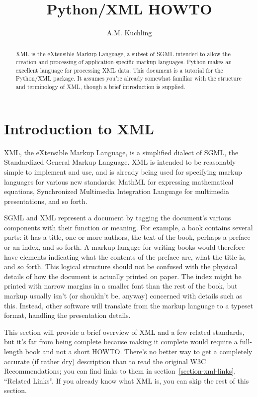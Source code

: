 \documentclass{howto}
\title{Python/XML HOWTO}
\author{A.M. Kuchling}
\begin{document}
\maketitle

\begin{abstract}
\noindent
XML is the eXtensible Markup Language, a subset of SGML intended to
allow the creation and processing of application-specific markup
languages.  Python makes an excellent language for processing XML
data.  This document is a tutorial for the Python/XML package.  It
assumes you're already somewhat familiar with the structure and
terminology of XML, though a brief introduction is supplied.
\end{abstract}

\tableofcontents


\section{Introduction to XML\label{section-introduction}}

XML, the eXtensible Markup Language, is a simplified dialect of SGML,
the Standardized General Markup Language.  XML is intended to be
reasonably simple to implement and use, and is already being used for
specifying markup languages for various new standards: MathML for
expressing mathematical equations, Synchronized Multimedia Integration
Language for multimedia presentations, and so forth.

SGML and XML represent a document by tagging the document's various
components with their function or meaning.  For example, a book
contains several parts: it has a title, one or more authors, the text
of the book, perhaps a preface or an index, and so forth.  A markup
languge for writing books would therefore have elements indicating
what the contents of the preface are, what the title is, and so forth.
This logical structure should not be confused with the physical
details of how the document is actually printed on paper.  The index
might be printed with narrow margins in a smaller font than the rest
of the book, but markup usually isn't (or shouldn't be, anyway)
concerned with details such as this.  Instead, other software will
translate from the markup language to a typeset format, handling the
presentation details.

This section will provide a brief overview of XML and a few related
standards, but it's far from being complete because making it complete
would require a full-length book and not a short HOWTO. There's no
better way to get a completely accurate (if rather dry) description
than to read the original W3C Recommendations; you can find links to
them in section~\ref{section-xml-links}, ``Related Links''.  If you already
know what XML is, you can skip the rest of this section.
\end{document}

